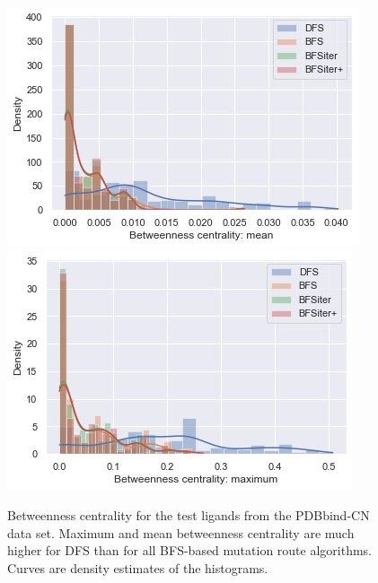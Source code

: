\begin{figure}[H]
	
	\includegraphics[scale=0.8]{betweenness_mean_all}\includegraphics[scale=0.8]{betweenness_max_all}\caption{Betweenness centrality for the test ligands from the PDBbind-CN data set. Maximum and mean betweenness centrality are much higher for DFS than for all BFS-based mutation route algorithms. Curves are density estimates of the histograms.}
	\label{fig:betweenness_centrality}
\end{figure}

